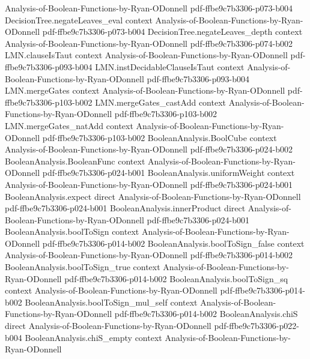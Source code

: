 \begin{theorem}
  {Analysis-of-Boolean-Functions-by-Ryan-ODonnell}
  {pdf-ffbe9c7b3306-p073-b004}
\proofstep
  {DecisionTree.negateLeaves_eval}
  {context}
  {Analysis-of-Boolean-Functions-by-Ryan-ODonnell}
  {pdf-ffbe9c7b3306-p073-b004}
\proofstep
  {DecisionTree.negateLeaves_depth}
  {context}
  {Analysis-of-Boolean-Functions-by-Ryan-ODonnell}
  {pdf-ffbe9c7b3306-p074-b002}
\proofstep
  {LMN.clauseIsTaut}
  {context}
  {Analysis-of-Boolean-Functions-by-Ryan-ODonnell}
  {pdf-ffbe9c7b3306-p093-b004}
\proofstep
  {LMN.instDecidableClauseIsTaut}
  {context}
  {Analysis-of-Boolean-Functions-by-Ryan-ODonnell}
  {pdf-ffbe9c7b3306-p093-b004}
\proofstep
  {LMN.mergeGates}
  {context}
  {Analysis-of-Boolean-Functions-by-Ryan-ODonnell}
  {pdf-ffbe9c7b3306-p103-b002}
\proofstep
  {LMN.mergeGates_castAdd}
  {context}
  {Analysis-of-Boolean-Functions-by-Ryan-ODonnell}
  {pdf-ffbe9c7b3306-p103-b002}
\proofstep
  {LMN.mergeGates_natAdd}
  {context}
  {Analysis-of-Boolean-Functions-by-Ryan-ODonnell}
  {pdf-ffbe9c7b3306-p103-b002}
\proofstep
  {BooleanAnalysis.BoolCube}
  {context}
  {Analysis-of-Boolean-Functions-by-Ryan-ODonnell}
  {pdf-ffbe9c7b3306-p024-b002}
\proofstep
  {BooleanAnalysis.BooleanFunc}
  {context}
  {Analysis-of-Boolean-Functions-by-Ryan-ODonnell}
  {pdf-ffbe9c7b3306-p024-b001}
\proofstep
  {BooleanAnalysis.uniformWeight}
  {context}
  {Analysis-of-Boolean-Functions-by-Ryan-ODonnell}
  {pdf-ffbe9c7b3306-p024-b001}
\proofstep
  {BooleanAnalysis.expect}
  {direct}
  {Analysis-of-Boolean-Functions-by-Ryan-ODonnell}
  {pdf-ffbe9c7b3306-p024-b001}
\proofstep
  {BooleanAnalysis.innerProduct}
  {direct}
  {Analysis-of-Boolean-Functions-by-Ryan-ODonnell}
  {pdf-ffbe9c7b3306-p024-b001}
\proofstep
  {BooleanAnalysis.boolToSign}
  {context}
  {Analysis-of-Boolean-Functions-by-Ryan-ODonnell}
  {pdf-ffbe9c7b3306-p014-b002}
\proofstep
  {BooleanAnalysis.boolToSign_false}
  {context}
  {Analysis-of-Boolean-Functions-by-Ryan-ODonnell}
  {pdf-ffbe9c7b3306-p014-b002}
\proofstep
  {BooleanAnalysis.boolToSign_true}
  {context}
  {Analysis-of-Boolean-Functions-by-Ryan-ODonnell}
  {pdf-ffbe9c7b3306-p014-b002}
\proofstep
  {BooleanAnalysis.boolToSign_sq}
  {context}
  {Analysis-of-Boolean-Functions-by-Ryan-ODonnell}
  {pdf-ffbe9c7b3306-p014-b002}
\proofstep
  {BooleanAnalysis.boolToSign_mul_self}
  {context}
  {Analysis-of-Boolean-Functions-by-Ryan-ODonnell}
  {pdf-ffbe9c7b3306-p014-b002}
\proofstep
  {BooleanAnalysis.chiS}
  {direct}
  {Analysis-of-Boolean-Functions-by-Ryan-ODonnell}
  {pdf-ffbe9c7b3306-p022-b004}
\proofstep
  {BooleanAnalysis.chiS_empty}
  {context}
  {Analysis-of-Boolean-Functions-by-Ryan-ODonnell}

\end{theorem}

